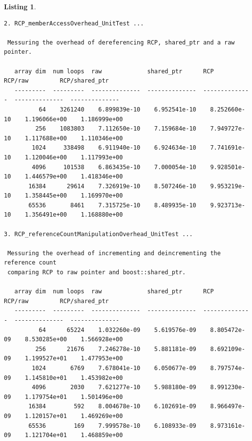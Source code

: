 \documentclass[pdf,ps2pdf,11pt]{SANDreport}
\newtheorem{listing}{Listing}
\begin{document}
\begin{listing}
{\begin{verbatim}
2. RCP_memberAccessOverhead_UnitTest ... 
 
 Messuring the overhead of dereferencing RCP, shared_ptr and a raw pointer.
 
   array dim  num loops  raw             shared_ptr      RCP             RCP/raw         RCP/shared_ptr
   ---------  ---------  --------------  --------------  --------------  --------------  --------------
          64    3261240    6.899839e-10    6.952541e-10    8.252660e-10    1.196066e+00    1.186999e+00
         256    1083803    7.112650e-10    7.159684e-10    7.949727e-10    1.117688e+00    1.110346e+00
        1024     338498    6.911940e-10    6.924634e-10    7.741691e-10    1.120046e+00    1.117993e+00
        4096     101538    6.863435e-10    7.000054e-10    9.928501e-10    1.446579e+00    1.418346e+00
       16384      29614    7.326919e-10    8.507246e-10    9.953219e-10    1.358445e+00    1.169970e+00
       65536       8461    7.315725e-10    8.489935e-10    9.923713e-10    1.356491e+00    1.168880e+00

3. RCP_referenceCountManipulationOverhead_UnitTest ... 
 
 Messuring the overhead of incrementing and deincrementing the reference count
 comparing RCP to raw pointer and boost::shared_ptr.
 
   array dim  num loops  raw             shared_ptr      RCP             RCP/raw         RCP/shared_ptr
   ---------  ---------  --------------  --------------  --------------  --------------  --------------
          64      65224    1.032260e-09    5.619576e-09    8.805472e-09    8.530285e+00    1.566928e+00
         256      21676    7.246278e-10    5.881181e-09    8.692109e-09    1.199527e+01    1.477953e+00
        1024       6769    7.678041e-10    6.050677e-09    8.797574e-09    1.145810e+01    1.453982e+00
        4096       2030    7.621277e-10    5.988180e-09    8.991230e-09    1.179754e+01    1.501496e+00
       16384        592    8.004678e-10    6.102691e-09    8.966497e-09    1.120157e+01    1.469269e+00
       65536        169    7.999578e-10    6.108933e-09    8.973161e-09    1.121704e+01    1.468859e+00
\end{verbatim}}
\end{listing}

\pagebreak
\end{document}
